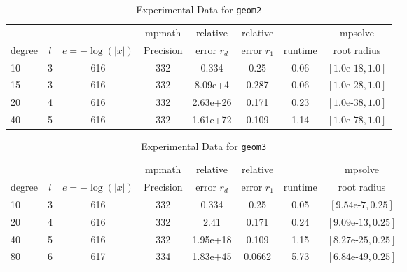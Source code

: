 \documentclass[sigconf]{acmart}
\begin{document}
\begin{table}[t]
\caption{Experimental Data for \texttt{geom2}} %
\label{tab:geom2}
\vskip -0.15in
\begin{center}
\begin{small}
\begin{sc}
\begin{tabular}{lccccccc}
\toprule
&  &  & mpmath & relative  & relative &  & mpsolve \\
degree  & $l$& $e=-\log(|x|)$& Precision &error $r_d$       & error $r_1$ &runtime& root radius\\
\midrule
 10 & 3 & 616 & 332 & 0.334 & 0.25 & 0.06 & $[1.0\text{e-}18, 1.0]$\\
 15 & 3 & 616 & 332 & 8.09e+4 & 0.287 & 0.06 & $[1.0\text{e-}28, 1.0]$\\
 20 & 4 & 616 & 332 & 2.63e+26 & 0.171 & 0.23 & $[1.0\text{e-}38, 1.0]$\\
 40 & 5 & 616 & 332 & 1.61e+72 & 0.109 & 1.14 & $[1.0\text{e-}78, 1.0]$\\
\bottomrule
\end{tabular}
\end{sc}
\end{small}
\end{center}
\vskip 0.05in
\end{table}

\begin{table}[t]
\caption{Experimental Data for \texttt{geom3}} %
\label{tab:geom3}
\vskip -0.15in
\begin{center}
\begin{small}
\begin{sc}
\begin{tabular}{lccccccc}
\toprule
&  &  & mpmath & relative  & relative &  & mpsolve \\
degree  & $l$& $e=-\log(|x|)$& Precision &error $r_d$       & error $r_1$ &runtime& root radius\\
\midrule
 10 & 3 & 616 & 332 & 0.334 & 0.25 & 0.05 & $[9.54\text{e-}7, 0.25]$\\
 20 & 4 & 616 & 332 & 2.41 & 0.171 & 0.24 & $[9.09\text{e-}13, 0.25]$\\
 40 & 5 & 616 & 332 & 1.95e+18 & 0.109 & 1.15 & $[8.27\text{e-}25, 0.25]$\\
 80 & 6 & 617 & 334 & 1.83e+45 & 0.0662 & 5.73 & $[6.84\text{e-}49, 0.25]$\\
\bottomrule
\end{tabular}
\end{sc}
\end{small}
\end{center}
\vskip 0.05in
\end{table}
\end{document}
